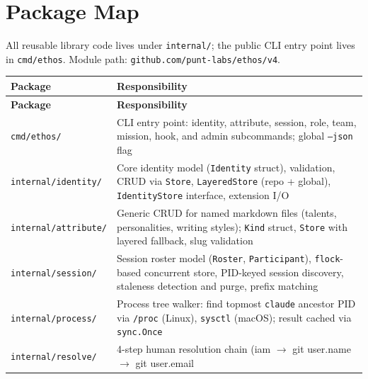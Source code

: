 \documentclass[a4paper,10pt]{article}
\newcommand{\pkg}[1]{\texttt{#1}}
\newcommand{\cmd}[1]{\texttt{#1}}
\begin{document}
\section{Package Map}

All reusable library code lives under \pkg{internal/}; the public
CLI entry point lives in \pkg{cmd/ethos}.  Module path:
\texttt{github.com/punt-labs/ethos/v4}.

\begin{center}
\begin{longtable}{@{}lp{8.5cm}@{}}
\toprule
\textbf{Package} & \textbf{Responsibility} \\
\midrule
\endfirsthead
\toprule
\textbf{Package} & \textbf{Responsibility} \\
\midrule
\endhead
\pkg{cmd/ethos/}        & CLI entry point: identity, attribute,
                          session, role, team, mission, hook, and
                          admin subcommands; global \cmd{--json} flag \\
\pkg{internal/identity/} & Core identity model (\texttt{Identity}
                          struct), validation, CRUD via \texttt{Store},
                          \texttt{LayeredStore} (repo + global),
                          \texttt{IdentityStore} interface,
                          extension I/O \\
\pkg{internal/attribute/} & Generic CRUD for named markdown files
                          (talents, personalities, writing styles);
                          \texttt{Kind} struct, \texttt{Store} with
                          layered fallback, slug validation \\
\pkg{internal/session/}  & Session roster model (\texttt{Roster},
                          \texttt{Participant}), \texttt{flock}-based
                          concurrent store, PID-keyed session
                          discovery, staleness detection and purge,
                          prefix matching \\
\pkg{internal/process/}  & Process tree walker: find topmost
                          \texttt{claude} ancestor PID via
                          \texttt{/proc} (Linux), \texttt{sysctl}
                          (macOS); result cached via
                          \texttt{sync.Once} \\
\pkg{internal/resolve/}  & 4-step human resolution chain (iam
                          $\to$ git user.name $\to$ git user.email

\end{longtable}
\end{center}
\end{document}
